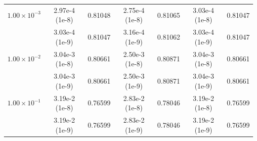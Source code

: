 \begin{table}[ht]
\begin{tabular}{c c c c c c c}
        $1.00 \times 10^{-3}$           & 2.97e-4 (1e-8)                     & 0.81048                            & 2.75e-4 (1e-8)                    & 0.81065                    & 3.03e-4 (1e-8)              & 0.81047                    \\
                                        & 3.03e-4 (1e-9)                     & 0.81047                            & 3.16e-4 (1e-9)                    & 0.81062                    & 3.03e-4 (1e-9)              & 0.81047                    \\
        $1.00 \times 10^{-2}$           & 3.04e-3 (1e-8)                     & 0.80661                            & 2.50e-3 (1e-8)                    & 0.80871                    & 3.04e-3 (1e-8)              & 0.80661                    \\
                                        & 3.04e-3 (1e-9)                     & 0.80661                            & 2.50e-3 (1e-9)                    & 0.80871                    & 3.04e-3 (1e-9)              & 0.80661                    \\
        $1.00 \times 10^{-1}$           & 3.19e-2 (1e-8)                     & 0.76599                            & 2.83e-2 (1e-8)                    & 0.78046                    & 3.19e-2 (1e-8)              & 0.76599                    \\
                                        & 3.19e-2 (1e-9)                     & 0.76599                            & 2.83e-2 (1e-9)                    & 0.78046                    & 3.19e-2 (1e-9)              & 0.76599                    \\
        \hline
    \end{tabular}
\end{table}